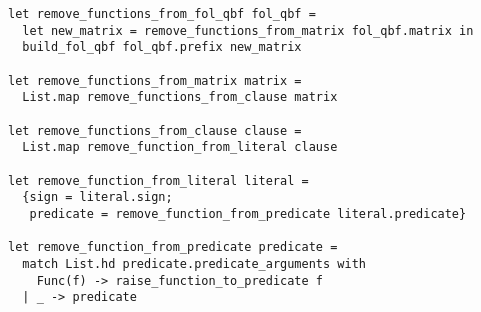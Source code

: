 \begin{lstlisting}[language=caml, label=removingfunctionsimpl]
let remove_functions_from_fol_qbf fol_qbf =
  let new_matrix = remove_functions_from_matrix fol_qbf.matrix in
  build_fol_qbf fol_qbf.prefix new_matrix

let remove_functions_from_matrix matrix =
  List.map remove_functions_from_clause matrix

let remove_functions_from_clause clause =
  List.map remove_function_from_literal clause

let remove_function_from_literal literal =
  {sign = literal.sign; 
   predicate = remove_function_from_predicate literal.predicate}

let remove_function_from_predicate predicate =
  match List.hd predicate.predicate_arguments with
    Func(f) -> raise_function_to_predicate f
  | _ -> predicate
\end{lstlisting}
